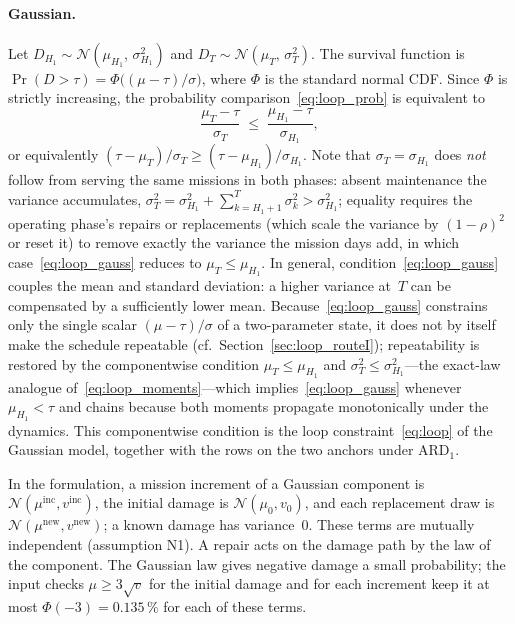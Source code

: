 \documentclass[11pt,a4paper]{article}
\theoremstyle{plain}
\theoremstyle{definition}
\theoremstyle{remark}
\begin{document}
\paragraph{Gaussian.}
Let $D_{H_1} \sim \mathcal{N}(\mu_{H_1},\,\sigma_{H_1}^2)$ and $D_T \sim \mathcal{N}(\mu_T,\,\sigma_T^2)$.
The survival function is $\Pr(D > \tau) = \Phi\bigl((\mu - \tau)/\sigma\bigr)$, where $\Phi$ is the standard normal CDF.
Since $\Phi$ is strictly increasing, the probability comparison~\eqref{eq:loop_prob} is equivalent to
\begin{equation}\label{eq:loop_gauss}
  \frac{\mu_T - \tau}{\sigma_T} \;\le\; \frac{\mu_{H_1} - \tau}{\sigma_{H_1}},
\end{equation}
or equivalently $(\tau - \mu_T)/\sigma_T \ge (\tau - \mu_{H_1})/\sigma_{H_1}$.
Note that $\sigma_T = \sigma_{H_1}$ does \emph{not} follow from serving the same missions in both phases: absent maintenance the variance accumulates, $\sigma^2_T = \sigma^2_{H_1} + \sum_{k = H_1+1}^{T} \sigma^2_k > \sigma^2_{H_1}$; equality requires the operating phase's repairs or replacements (which scale the variance by $(1-\rho)^2$ or reset it) to remove exactly the variance the mission days add, in which case~\eqref{eq:loop_gauss} reduces to $\mu_T \le \mu_{H_1}$.
In general, condition~\eqref{eq:loop_gauss} couples the mean and standard deviation: a higher variance at~$T$ can be compensated by a sufficiently lower mean.
Because~\eqref{eq:loop_gauss} constrains only the single scalar $(\mu - \tau)/\sigma$ of a two-parameter state, it does not by itself make the schedule repeatable (cf.\ Section~\ref{sec:loop_routeI}); repeatability is restored by the componentwise condition $\mu_T \le \mu_{H_1}$ and $\sigma^2_T \le \sigma^2_{H_1}$---the exact-law analogue of~\eqref{eq:loop_moments}---which implies~\eqref{eq:loop_gauss} whenever $\mu_{H_1} < \tau$ and chains because both moments propagate monotonically under the dynamics.
This componentwise condition is the loop constraint~\eqref{eq:loop} of the Gaussian model, together with the rows on the two anchors under $\text{ARD}_1$.

In the formulation, a mission increment of a Gaussian component is $\mathcal{N}(\mu^{\mathrm{inc}}, v^{\mathrm{inc}})$, the initial damage is $\mathcal{N}(\mu_0, v_0)$, and each replacement draw is $\mathcal{N}(\mu^{\mathrm{new}}, v^{\mathrm{new}})$; a known damage has variance~$0$.
These terms are mutually independent (assumption N1).
A repair acts on the damage path by the law of the component.
The Gaussian law gives negative damage a small probability; the input checks $\mu \ge 3\sqrt{v}$ for the initial damage and for each increment keep it at most $\Phi(-3) = 0.135\,\%$ for each of these terms.
\end{document}
